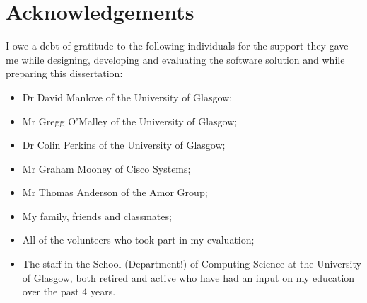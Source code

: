 \documentclass{l4proj}
\begin{document}
\newpage
\section*{Acknowledgements}
I owe a debt of gratitude to the following individuals for the support they gave me while designing, developing and evaluating the software solution and while preparing this dissertation:
\begin{itemize}
\item Dr David Manlove of the University of Glasgow;
\item Mr Gregg O'Malley of the University of Glasgow;
\item Dr Colin Perkins of the University of Glasgow;
\item Mr Graham Mooney of Cisco Systems;
\item Mr Thomas Anderson of the Amor Group;
\item My family, friends and classmates;
\item All of the volunteers who took part in my evaluation;
\item The staff in the School (Department!) of Computing Science at the University of Glasgow, both retired and active who have had an input on my education over the past 4 years.
\end{itemize}

\educationalconsent
%









\tableofcontents










\appendix

\printglossaries



\end{document}
